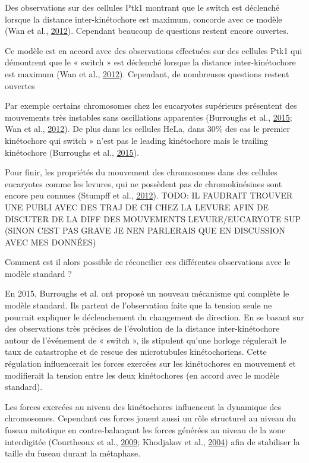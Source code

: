 \documentclass[12pt,a4paper,twoside,openright]{book}
\begin{document}
Des observations sur des cellules Ptk1 montrant que le switch est
déclenché lorsque la distance inter-kinétochore est maximum, concorde
avec ce modèle (Wan et al., \hyperref[ref-Wan2012]{2012}). Cependant
beaucoup de questions restent encore ouvertes.

Ce modèle est en accord avec des observations effectuées sur des
cellules Ptk1 qui démontrent que le « switch » est déclenché lorsque la
distance inter-kinétochore est maximum (Wan et al.,
\hyperref[ref-Wan2012]{2012}). Cependant, de nombreuses questions
restent ouvertes

Par exemple certains chromosomes chez les eucaryotes supérieurs
présentent des mouvements très instables sans oscillations apparentes
(Burroughs et al., \hyperref[ref-Burroughs2015]{2015}; Wan et al.,
\hyperref[ref-Wan2012]{2012}). De plus dans les cellules HeLa, dans 30\%
des cas le premier kinétochore qui switch » n'est pas le leading
kinétochore mais le trailing kinétochore (Burroughs et al.,
\hyperref[ref-Burroughs2015]{2015}).

Pour finir, les propriétés du mouvement des chromosomes dans des
cellules eucaryotes comme les levures, qui ne possèdent pas de
chromokinésines sont encore peu connues (Stumpff et al.,
\hyperref[ref-Stumpff2012]{2012}). TODO: IL FAUDRAIT TROUVER UNE PUBLI
AVEC DES TRAJ DE CH CHEZ LA LEVURE AFIN DE DISCUTER DE LA DIFF DES
MOUVEMENTS LEVURE/EUCARYOTE SUP (SINON CEST PAS GRAVE JE NEN PARLERAIS
QUE EN DISCUSSION AVEC MES DONNÉES)

Comment est il alors possible de réconcilier ces différentes
observations avec le modèle standard ?

En 2015, Burroughs et al. ont proposé un nouveau mécanisme qui complète
le modèle standard. Ils partent de l'observation faite que la tension
seule ne pourrait expliquer le déclenchement du changement de direction.
En se basant sur des observations très précises de l'évolution de la
distance inter-kinétochore autour de l'événement de « switch », ils
stipulent qu'une horloge régulerait le taux de catastrophe et de rescue
des microtubules kinétochoriens. Cette régulation influencerait les
forces exercées sur les kinétochores en mouvement et modifierait la
tension entre les deux kinétochores (en accord avec le modèle standard).

Les forces exercées au niveau des kinétochores influencent la dynamique
des chromosomes. Cependant ces forces jouent aussi un rôle structurel au
niveau du fuseau mitotique en contre-balançant les forces générées au
niveau de la zone interdigitée (Courtheoux et al.,
\hyperref[ref-Courtheoux2009]{2009}; Khodjakov et al.,
\hyperref[ref-Khodjakov2004]{2004}) afin de stabiliser la taille du
fuseau durant la métaphase.
\end{document}
